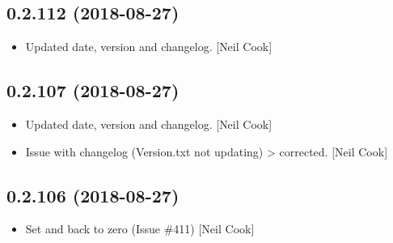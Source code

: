 \documentclass[a4paper,10pt,english]{report}
\begin{document}
\subsection{0.2.112 (2018-08-27)}
\label{\detokenize{misc/changelog:id350}}\begin{itemize}
\item {} 
Updated date, version and changelog. {[}Neil Cook{]}

\end{itemize}


\subsection{0.2.107 (2018-08-27)}
\label{\detokenize{misc/changelog:id351}}\begin{itemize}
\item {} 
Updated date, version and changelog. {[}Neil Cook{]}

\item {} 
Issue with changelog (Version.txt not updating) \textendash{}\textgreater{} corrected. {[}Neil
Cook{]}

\end{itemize}


\subsection{0.2.106 (2018-08-27)}
\label{\detokenize{misc/changelog:id352}}\begin{itemize}
\item {} 
Set  and  back to zero (Issue \#411)
{[}Neil Cook{]}

\end{itemize}
\end{document}

